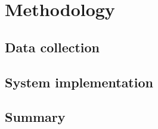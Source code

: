 \documentclass[thesis.tex]{subfiles}
\begin{document}
\chapter{Methodology} \label{methodology}


\section{Data collection} \label{datacollection}


\section{System implementation} \label{systemimplementation}


\section{Summary} \label{03summary}
\end{document}
